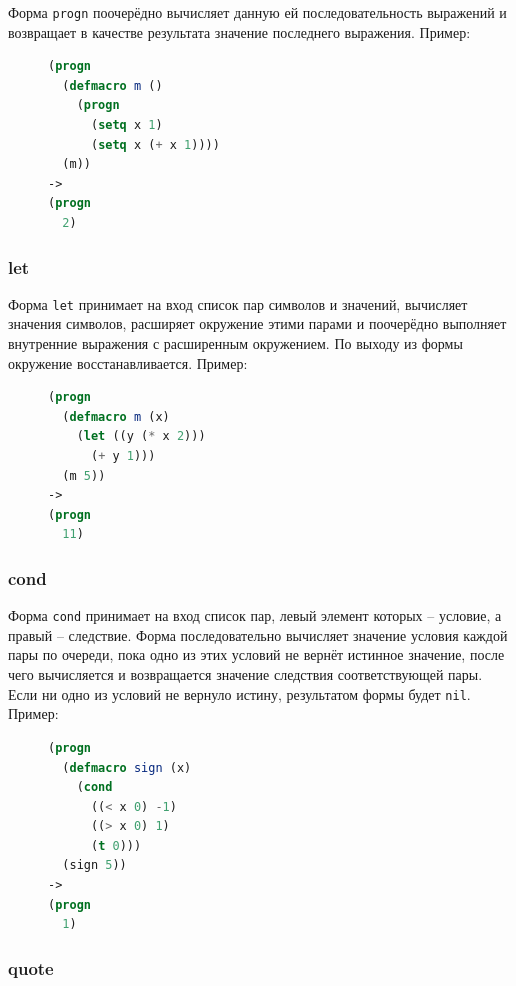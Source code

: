 Форма \texttt{progn} поочерёдно вычисляет данную ей последовательность выражений и возвращает в качестве результата значение последнего выражения. Пример:

\begin{figure}[H]
\begin{lstlisting}[language=Lisp]
(progn
  (defmacro m ()
    (progn
      (setq x 1)
      (setq x (+ x 1))))
  (m))
->
(progn
  2)
\end{lstlisting}
\end{figure}

\subsubsection{let}

Форма \texttt{let} принимает на вход список пар символов и значений, вычисляет значения символов, расширяет окружение этими парами и поочерёдно выполняет внутренние выражения с расширенным окружением. По выходу из формы окружение восстанавливается. Пример:

\begin{figure}[H]
\begin{lstlisting}[language=Lisp]
(progn
  (defmacro m (x)
    (let ((y (* x 2)))
      (+ y 1)))
  (m 5))
->
(progn
  11)
\end{lstlisting}
\end{figure}

\subsubsection{cond}

Форма \texttt{cond} принимает на вход список пар, левый элемент которых -- условие, а правый -- следствие. Форма последовательно вычисляет значение условия каждой пары по очереди, пока одно из этих условий не вернёт истинное значение, после чего вычисляется и возвращается значение следствия соответствующей пары. Если ни одно из условий не вернуло истину, результатом формы будет \texttt{nil}. Пример:

\begin{figure}[H]
\begin{lstlisting}[language=Lisp]
(progn
  (defmacro sign (x)
    (cond
      ((< x 0) -1)
      ((> x 0) 1)
      (t 0)))
  (sign 5))
->
(progn
  1)
\end{lstlisting}
\end{figure}

\subsubsection{quote}

